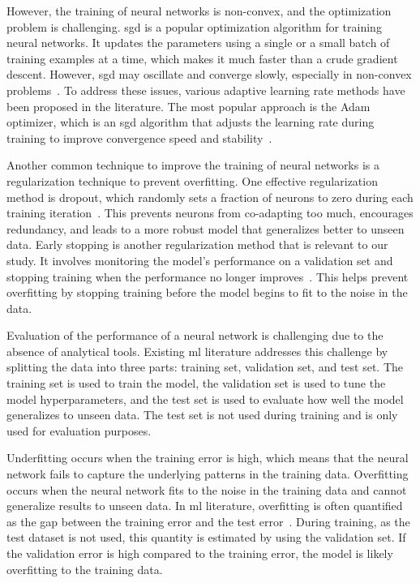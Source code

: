However, the training of neural networks is non-convex, and the optimization problem is challenging.
\gls{sgd} is a popular optimization algorithm for training neural networks.
It updates the parameters using a single or a small batch of training examples at a time, which makes it much faster than a crude gradient descent.
However, \gls{sgd} may oscillate and converge slowly, especially in non-convex problems~\citep{bengio2016}.
To address these issues, various adaptive learning rate methods have been proposed in the literature.
The most popular approach is the Adam optimizer, which is an \gls{sgd} algorithm that adjusts the learning rate during training to improve convergence speed and stability~\citep{kingma2014adam}.

Another common technique to improve the training of neural networks is a regularization technique to prevent overfitting.
One effective regularization method is dropout, which randomly sets a fraction of neurons to zero during each training iteration~\citep{srivastava2014dropout}.
This prevents neurons from co-adapting too much, encourages redundancy, and leads to a more robust model that generalizes better to unseen data.
Early stopping is another regularization method that is relevant to our study.
It involves monitoring the model's performance on a validation set and stopping training when the performance no longer improves~\citep{prechelt2002early}.
This helps prevent overfitting by stopping training before the model begins to fit to the noise in the data.

Evaluation of the performance of a neural network is challenging due to the absence of analytical tools.
Existing \gls{ml} literature addresses this challenge by splitting the data into three parts: training set, validation set, and test set.
The training set is used to train the model, the validation set is used to tune the model hyperparameters, and the test set is used to evaluate how well the model generalizes to unseen data.
The test set is not used during training and is only used for evaluation purposes.

Underfitting occurs when the training error is high, which means that the neural network fails to capture the underlying patterns in the training data.
Overfitting occurs when the neural network fits to the noise in the training data and cannot generalize results to unseen data.
In \gls{ml} literature, overfitting is often quantified as the gap between the training error and the test error~\citep{bishop2006pattern}.
During training, as the test dataset is not used, this quantity is estimated by using the validation set.
If the validation error is high compared to the training error, the model is likely overfitting to the training data.

